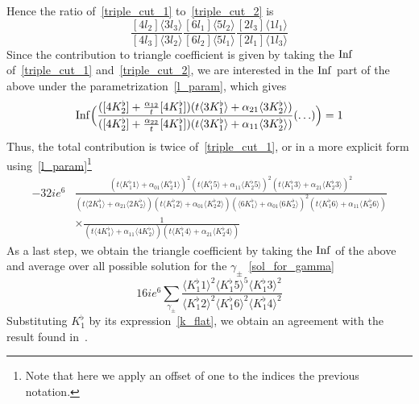 Hence the ratio of~\cref{triple_cut_1} to~\cref{triple_cut_2} is
\begin{equation}
\frac{[4l_2]\langle 3l_3\rangle}{[4l_3]\langle 3l_2\rangle}
\frac{[6l_1]\langle 5l_2\rangle}{[6l_2]\langle 5l_1\rangle}
\frac{[2l_3]\langle 1l_1\rangle}{[2l_1]\langle 1l_3\rangle}
\end{equation}
Since the contribution to triangle coefficient is given by taking the $\mathrm{Inf}$ of~\cref{triple_cut_1} and~\cref{triple_cut_2}, we are interested in the $\mathrm{Inf}$ part of the above under the parametrization~\cref{l_param}, which gives
\begin{equation}
\mathrm{Inf}\Big(\frac{([4K_2^\flat] + \frac{\alpha_{12}}{t}[4K_1^\flat])(t\langle 3K_1^\flat \rangle + \alpha_{21}\langle 3K_2^\flat\rangle)}{([4K_2^\flat] + \frac{\alpha_{22}}{t}[4K_1^\flat])(t\langle 3K_1^\flat \rangle + \alpha_{11}\langle 3K_2^\flat\rangle)}(\ldots)\Big)
= 1
\end{equation} 
%
Thus, the total contribution is twice of~\ref{triple_cut_1}, or in a more explicit form using~\cref{l_param}\footnote{
Note that here we apply an offset of one to the indices \wrt the previous notation.
}
\begin{equation}
\begin{split}
-32ie^6 & \frac{(t\langle K_1^\flat 1 \rangle + \alpha_{01}\langle K_2^\flat 1\rangle)^2
(t\langle K_1^\flat 5 \rangle + \alpha_{11}\langle K_2^\flat 5\rangle)^2
(t\langle K_1^\flat 3 \rangle + \alpha_{21}\langle K_2^\flat 3\rangle)^2
}{
(t\langle 2K_1^\flat  \rangle + \alpha_{21}\langle 2 K_2^\flat \rangle)
(t\langle K_1^\flat 2 \rangle + \alpha_{01}\langle K_2^\flat 2\rangle)
(\langle  6K_1^\flat  \rangle + \alpha_{01}\langle  6K_2^\flat \rangle)^2
(t\langle K_1^\flat 6 \rangle + \alpha_{11}\langle K_2^\flat 6\rangle)}
\\
&\times
\frac{1}{
(t\langle 4K_1^\flat  \rangle + \alpha_{11}\langle 4 K_2^\flat \rangle)
(t\langle K_1^\flat 4 \rangle + \alpha_{21}\langle K_2^\flat 4 \rangle)
}
\end{split}
\end{equation}
As a last step, we obtain the triangle coefficient by taking the $\mathrm{Inf}$ of the above and average over all possible solution for the $\gamma_\pm$~\cref{sol_for_gamma}
\begin{equation}
16ie^6\sum_{\gamma_\pm}\frac{\langle K_1^\flat 1 \rangle^2\langle K_1^\flat 5\rangle^5 \langle K_1^\flat 3 \rangle^2}{\langle K_1^\flat 2 \rangle^2\langle K_1^\flat 6\rangle^2 \langle K_1^\flat 4 \rangle^2}
\end{equation}
Substituting $K_1^\flat$ by its expression~\cref{k_flat}, we obtain an agreement with the result found in~\cite{Forde:2007mi}.










